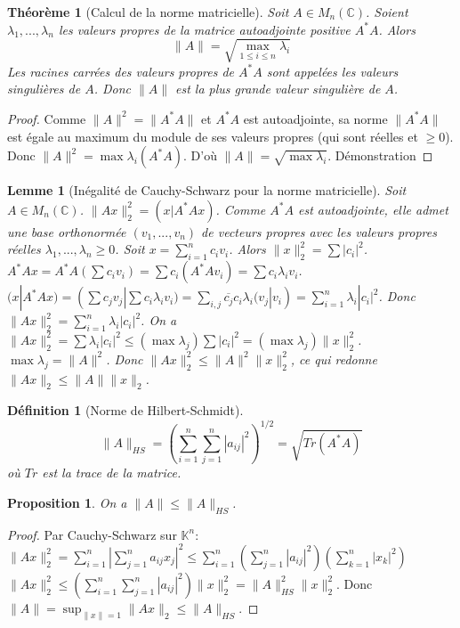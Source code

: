 \documentclass{article}
\newtheorem{theorem}{Théorème} %
\newtheorem{lemma}{Lemme} %
\newtheorem{proposition}{Proposition} %
\newtheorem{definition}{Définition} %
\theoremstyle{definition} %
\begin{document}
\begin{theorem}[Calcul de la norme matricielle]
Soit $A \in M_n(\mathbb{C})$. Soient $\lambda_1, ..., \lambda_n$ les valeurs propres de la matrice autoadjointe positive $A^*A$. Alors
\[ \|A\| = \sqrt{\max_{1 \le i \le n} \lambda_i} \]
Les racines carrées des valeurs propres de $A^*A$ sont appelées les valeurs singulières de $A$. Donc $\|A\|$ est la plus grande valeur singulière de $A$.
\end{theorem}
\begin{proof}
Comme $\|A\|^2 = \|A^*A\|$ et $A^*A$ est autoadjointe, sa norme $\|A^*A\|$ est égale au maximum du module de ses valeurs propres (qui sont réelles et $\ge 0$).
Donc $\|A\|^2 = \max \lambda_i (A^*A)$.
D'où $\|A\| = \sqrt{\max \lambda_i}$.
\proofname{Démonstration}
\end{proof}

\begin{lemma}[Inégalité de Cauchy-Schwarz pour la norme matricielle]
Soit $A \in M_n(\mathbb{C})$.
$\|Ax\|_2^2 = (x|A^*Ax)$.
Comme $A^*A$ est autoadjointe, elle admet une base orthonormée $(v_1, ..., v_n)$ de vecteurs propres avec les valeurs propres réelles $\lambda_1, ..., \lambda_n \ge 0$.
Soit $x = \sum_{i=1}^n c_i v_i$. Alors $\|x\|_2^2 = \sum |c_i|^2$.
$A^*Ax = A^*A (\sum c_i v_i) = \sum c_i (A^*A v_i) = \sum c_i \lambda_i v_i$.
$(x|A^*Ax) = (\sum c_j v_j | \sum c_i \lambda_i v_i) = \sum_{i,j} \overline{c_j} c_i \lambda_i (v_j|v_i) = \sum_{i=1}^n \lambda_i |c_i|^2$.
Donc $\|Ax\|_2^2 = \sum_{i=1}^n \lambda_i |c_i|^2$.
On a $\|Ax\|_2^2 = \sum \lambda_i |c_i|^2 \le (\max \lambda_j) \sum |c_i|^2 = (\max \lambda_j) \|x\|_2^2$.
$\max \lambda_j = \|A\|^2$.
Donc $\|Ax\|_2^2 \le \|A\|^2 \|x\|_2^2$, ce qui redonne $\|Ax\|_2 \le \|A\| \|x\|_2$.
\end{lemma}

\begin{definition}[Norme de Hilbert-Schmidt]
\[ \|A\|_{HS} = \left( \sum_{i=1}^n \sum_{j=1}^n |a_{ij}|^2 \right)^{1/2} = \sqrt{Tr(A^*A)} \]
où $Tr$ est la trace de la matrice.
\end{definition}

\begin{proposition}
On a $\|A\| \le \|A\|_{HS}$.
\end{proposition}
\begin{proof}
Par Cauchy-Schwarz sur $\mathbb{K}^n$:
$\|Ax\|_2^2 = \sum_{i=1}^n \left| \sum_{j=1}^n a_{ij} x_j \right|^2 \le \sum_{i=1}^n \left( \sum_{j=1}^n |a_{ij}|^2 \right) \left( \sum_{k=1}^n |x_k|^2 \right)$
$\|Ax\|_2^2 \le \left( \sum_{i=1}^n \sum_{j=1}^n |a_{ij}|^2 \right) \|x\|_2^2 = \|A\|_{HS}^2 \|x\|_2^2$.
Donc $\|A\| = \sup_{\|x\|=1} \|Ax\|_2 \le \|A\|_{HS}$.
\end{proof}
\end{document}
